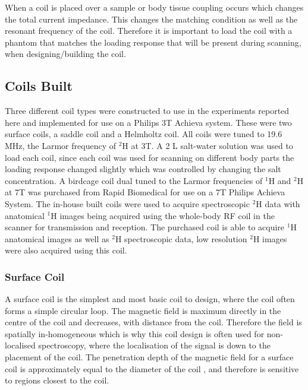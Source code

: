 When a coil is placed over a sample or body tissue coupling occurs which changes the total current impedance. This changes the matching condition as well as the resonant frequency of the coil. Therefore it is important to load the coil with a phantom that matches the loading response that will be present during scanning, when designing/building the coil. 

\subsection{Coils Built}

Three different coil types were constructed to use in the experiments reported here and implemented for use on a Philips 3T Achieva system. These were two surface coils, a saddle coil and a Helmholtz coil. All coils were tuned to 19.6 MHz, the Larmor frequency of $^2$H at 3T. A 2 L salt-water solution was used to load each coil, since each coil was used for scanning on different body parts the loading response changed slightly which was controlled by changing the salt concentration. A birdcage coil dual tuned to the Larmor frequencies of $^1$H and $^2$H at 7T was purchased from Rapid Biomedical for use on a 7T Philips Achieva System. The in-house built coils were used to acquire spectroscopic $^2$H data with anatomical $^1$H images being acquired using the whole-body \ac{RF} coil in the scanner for transmission and reception. The purchased coil is able to acquire $^1$H anatomical images as well as $^2$H spectroscopic data, low resolution $^2$H images were also acquired using this coil.

\subsubsection{Surface Coil}
\label{Chap:Theory:Coils}

A surface coil is the simplest and most basic coil to design, where the coil often forms a simple circular loop. The magnetic field is maximum directly in the centre of the coil and decreases, with distance from the coil. Therefore the field is spatially in-homogeneous which is why this coil design is often used for non-localised spectroscopy, where the localisation of the signal is down to the placement of the coil. The penetration depth of the magnetic field for a surface coil is approximately equal to the diameter of the coil \cite{Gruber2018RFNonphysicists}, and therefore is sensitive to regions closest to the coil. 

